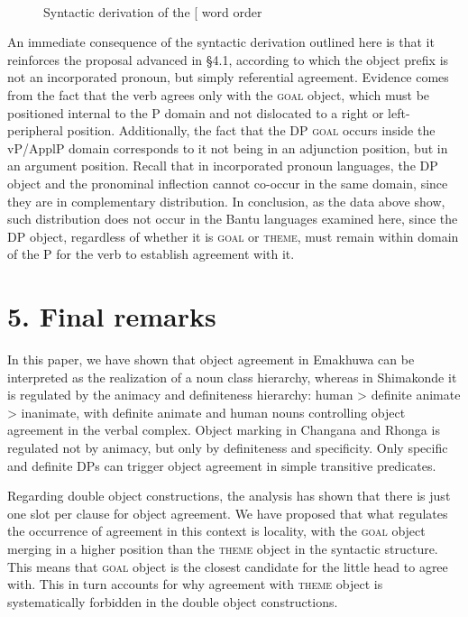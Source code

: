 \documentclass[output=paper]{langsci/langscibook}
\begin{document}
\gll   
 \\
\begin{stylecaption}\begin{figure}
\caption{Syntactic derivation of the [\textstyleFontepargpadroi{\textbf{\textsc{subject+verb+theme+goal]}}} word order}
\label{fig:4}
\end{figure}\end{stylecaption}

An immediate consequence of the syntactic derivation outlined here is that it reinforces the proposal advanced in §4.1, according to which the object prefix is not an incorporated pronoun, but simply referential agreement. Evidence comes from the fact that the verb agrees only with the \textsc{goal} object, which must be positioned internal to the P domain and not dislocated to a right or left-peripheral position. Additionally, the fact that the DP \textsc{goal} occurs inside the vP/ApplP domain corresponds to it not being in an adjunction position, but in an argument position. Recall that in incorporated pronoun languages, the DP object and the pronominal inflection cannot co-occur in the same domain, since they are in complementary distribution. In conclusion, as the data above show, such distribution does not occur in the Bantu languages examined here, since the DP object, regardless of whether it is \textsc{goal} or \textsc{theme}, must remain within domain of the P for the verb to establish agreement with it.

\section{ 5. Final remarks}

In this paper, we have shown that object agreement in Emakhuwa can be interpreted as the realization of a noun class hierarchy, whereas in Shimakonde it is regulated by the animacy and definiteness hierarchy: human {\textgreater} definite animate {\textgreater} inanimate, with definite animate and human nouns controlling object agreement in the verbal complex. Object marking in Changana and Rhonga is regulated not by animacy, but only by definiteness and specificity. Only specific and definite DPs can trigger object agreement in simple transitive predicates.

Regarding double object constructions, the analysis has shown that there is just one slot per clause for object agreement. We have proposed that what regulates the occurrence of agreement in this context is locality, with the \textsc{goal} object merging in a higher position than the \textsc{theme} object in the syntactic structure. This means that \textsc{goal} object is the closest candidate for the little  head to agree with. This in turn accounts for why agreement with \textsc{theme} object is systematically forbidden in the double object constructions. 
\end{document}
